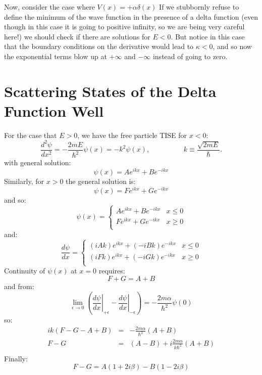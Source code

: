 \documentclass[12pt]{book}
\begin{document}
Now, consider the case where $V(x)=+\alpha \delta(x)$ If we stubbornly
refuse to define the minimum of the wave function in the presence of a
delta function (even though in this case it is going to positive
infinity, so we are being very careful here!) we should check if there
are solutions for $E<0$.  But notice in this case that the boundary
conditions on the derivative would lead to $\kappa < 0$, and so now
the exponential terms blow up at $+\infty$ and $-\infty$ instead of
going to zero.

\section{Scattering States of the Delta Function Well}

For the case that $E>0$, we have the free particle TISE for $x<0$:
\begin{equation*}
\frac{d^2 \psi}{d x^2} = -\frac{2mE}{\hbar^2}\psi(x) = -k^2 \psi(x), \hspace{2cm} k \equiv \frac{\sqrt{2mE}}{\hbar}.
\end{equation*}
with general solution:
$$\psi(x) = A e^{\displaystyle ikx} + B e^{\displaystyle -ikx}$$
Similarly, for $x>0$ the general solution is:
$$\psi(x) = F e^{\displaystyle ikx} + G e^{\displaystyle -ikx}$$
and so:
$$\psi(x) = \begin{cases}
A e^{\displaystyle ikx} + B e^{\displaystyle -ikx} &  x\leq0 \\
F e^{\displaystyle ikx} + G e^{\displaystyle -ikx} &  x\geq0 \\
\end{cases}
$$
and:
$$\frac{d\psi}{dx} = \begin{cases}
(iAk) e^{\displaystyle ikx} + (-iBk) e^{\displaystyle -ikx} &  x\leq0 \\
(iFk) e^{\displaystyle ikx} + (-iGk) e^{\displaystyle -ikx} &  x\geq0 \\
\end{cases}
$$
Continuity of $\psi(x)$ at $x=0$ requires:
$$F+G=A+B$$
and from:
$$
\lim_{\epsilon \to 0} \left( \left. \frac{d\psi}{d x} \right\rvert_{+\epsilon} 
- \left. \frac{d\psi}{d x} \right\rvert_{-\epsilon} \right) = 
-\frac{2m\alpha}{\hbar^2} \psi(0) 
$$
so:
\begin{eqnarray*}
ik(F-G-A+B) &=& -\frac{2m\alpha}{\hbar^2} (A+B) \\
F-G &=& (A-B)+i\frac{2m\alpha}{k\hbar^2} (A+B) \\
\end{eqnarray*}
Finally:
$$F-G = A (1+2i\beta) - B (1-2i\beta) $$
\end{document}
